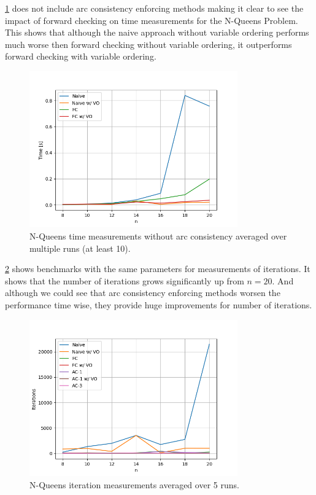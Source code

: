 \cref{fig:queens:time-no-arc} does not include arc consistency enforcing methods making it clear to see the impact of forward checking on time measurements for the N-Queens Problem. This shows that although the naive approach without variable ordering performs much worse then forward checking without variable ordering, it outperforms forward checking with variable ordering.

\begin{figure}[ht]
	\centering
	\includegraphics[width=0.8\textwidth]{./Problems/queens/plots/time_no_arc.png}
	\caption{N-Queens time measurements without arc consistency averaged over multiple runs (at least 10).}
	\label{fig:queens:time-no-arc}
\end{figure}

\cref{fig:queens:iterations} shows benchmarks with the same parameters for measurements of iterations. It shows that the number of iterations grows significantly up from $n = 20$. And although we could see that arc consistency enforcing methods worsen the performance time wise, they provide huge improvements for number of iterations.

\begin{figure}[ht]
	\centering
	\includegraphics[width=0.8\textwidth]{./Problems/queens/plots/iterations.png}
	\caption{N-Queens iteration measurements averaged over 5 runs.}
	\label{fig:queens:iterations}
\end{figure}

